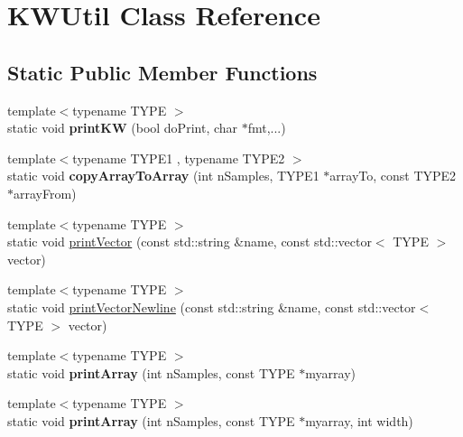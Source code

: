 \hypertarget{class_k_w_util}{}\section{K\+W\+Util Class Reference}
\label{class_k_w_util}
\subsection*{Static Public Member Functions}
\begin{DoxyCompactItemize}
\item 
{\footnotesize template$<$typename T\+Y\+PE $>$ }\\static void {\bfseries print\+KW} (bool do\+Print, char $\ast$fmt,...)\hypertarget{class_k_w_util_a5d14be8edc626d6b30b31c8d85c64d00}{}\label{class_k_w_util_a5d14be8edc626d6b30b31c8d85c64d00}

\item 
{\footnotesize template$<$typename T\+Y\+P\+E1 , typename T\+Y\+P\+E2 $>$ }\\static void {\bfseries copy\+Array\+To\+Array} (int n\+Samples, T\+Y\+P\+E1 $\ast$array\+To, const T\+Y\+P\+E2 $\ast$array\+From)\hypertarget{class_k_w_util_a74cbba48bf115ff4ddb90e4c8abfaaac}{}\label{class_k_w_util_a74cbba48bf115ff4ddb90e4c8abfaaac}

\item 
{\footnotesize template$<$typename T\+Y\+PE $>$ }\\static void \hyperlink{class_k_w_util_acc956bb7cbedc39fbca11a6414b66dac}{print\+Vector} (const std\+::string \&name, const std\+::vector$<$ T\+Y\+PE $>$ vector)
\item 
{\footnotesize template$<$typename T\+Y\+PE $>$ }\\static void \hyperlink{class_k_w_util_aec00dd2420ac8d850284db70c71c1c16}{print\+Vector\+Newline} (const std\+::string \&name, const std\+::vector$<$ T\+Y\+PE $>$ vector)
\item 
{\footnotesize template$<$typename T\+Y\+PE $>$ }\\static void {\bfseries print\+Array} (int n\+Samples, const T\+Y\+PE $\ast$myarray)\hypertarget{class_k_w_util_a9a809d578ed4b3647b7a92a8ee349a0e}{}\label{class_k_w_util_a9a809d578ed4b3647b7a92a8ee349a0e}

\item 
{\footnotesize template$<$typename T\+Y\+PE $>$ }\\static void {\bfseries print\+Array} (int n\+Samples, const T\+Y\+PE $\ast$myarray, int width)\hypertarget{class_k_w_util_a43228ea0afd7071af2d990ee550472e0}{}\label{class_k_w_util_a43228ea0afd7071af2d990ee550472e0}


\end{DoxyCompactItemize}
